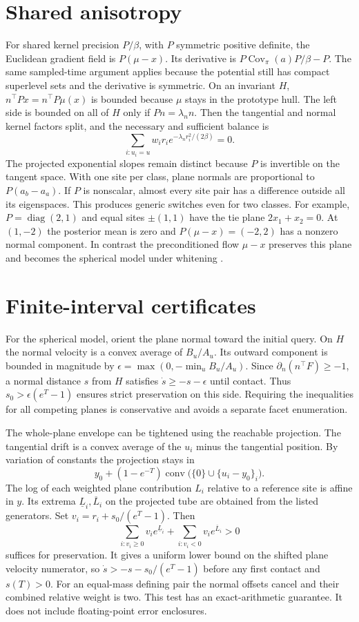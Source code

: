 \documentclass[final,5p,twocolumn]{elsarticle}
\begin{document}
\section{Shared anisotropy}

For shared kernel precision $P/\beta$, with $P$ symmetric positive
definite, the Euclidean gradient field is $P(\mu-x)$. Its derivative
is $P\operatorname{Cov}_{\pi}(a)P/\beta-P$. The same sampled-time
argument applies because the potential still has compact superlevel
sets and the derivative is symmetric. On an invariant $H$,
$n^\top P x=n^\top P\mu(x)$ is bounded because $\mu$ stays in the
prototype hull. The left side is bounded on all of $H$ only if
$Pn=\lambda_n n$. Then the tangential and normal kernel factors
split, and the necessary and sufficient balance is
\[
 \sum_{i:u_i=u}w_i r_i e^{-\lambda_n r_i^2/(2\beta)}=0.
\]
The projected exponential slopes remain distinct because $P$
is invertible on the tangent space. With one site per class, plane
normals are proportional to $P(a_b-a_a)$. If $P$ is nonscalar,
almost every site pair has a difference outside all its eigenspaces.
This produces generic switches even for two classes. For example,
$P=\operatorname{diag}(2,1)$ and equal sites $\pm(1,1)$ have the
tie plane $2x_1+x_2=0$. At $(1,-2)$ the posterior mean is zero and
$P(\mu-x)=(-2,2)$ has a nonzero normal component. In contrast the
preconditioned flow $\mu-x$ preserves this plane and becomes the
spherical model under whitening \cite{carreira2000}.

\section{Finite-interval certificates}

For the spherical model, orient the plane normal toward the initial
query. On $H$ the normal velocity is a convex average of $B_u/A_u$.
Its outward component is bounded in magnitude by
$\epsilon=\max(0,-\min_u B_u/A_u)$.
Since $\partial_n(n^\top F)\ge-1$, a normal distance $s$ from $H$
satisfies $\dot s\ge -s-\epsilon$ until contact. Thus
$s_0>\epsilon(e^T-1)$ ensures strict preservation on this side.
Requiring the inequalities for all competing planes is conservative
and avoids a separate facet enumeration.

The whole-plane envelope can be tightened using the reachable
projection. The tangential drift is a convex average of the $u_i$
minus the tangential position. By variation of constants the
projection stays in
\[
 y_0+(1-e^{-T})\operatorname{conv}\big(
     \{0\}\cup\{u_i-y_0\}_i\big).
\]
The log of each weighted plane contribution $L_i$ relative to a reference site is
affine in $y$. Its extrema $\underline L_i,\overline L_i$ on the
projected tube are obtained from the listed generators.
Set $v_i=r_i+s_0/(e^T-1)$. Then
\[
 \sum_{i:v_i\ge0} v_i e^{\underline L_i}
 +\sum_{i:v_i<0} v_i e^{\overline L_i}>0
\]
suffices for preservation. It gives a uniform lower bound on the
shifted plane velocity numerator, so $\dot s>-s-s_0/(e^T-1)$
before any first contact and $s(T)>0$. For an equal-mass defining
pair the normal offsets cancel and their combined relative weight
is two. This test has an exact-arithmetic guarantee. It does not
include floating-point error enclosures.
\end{document}
